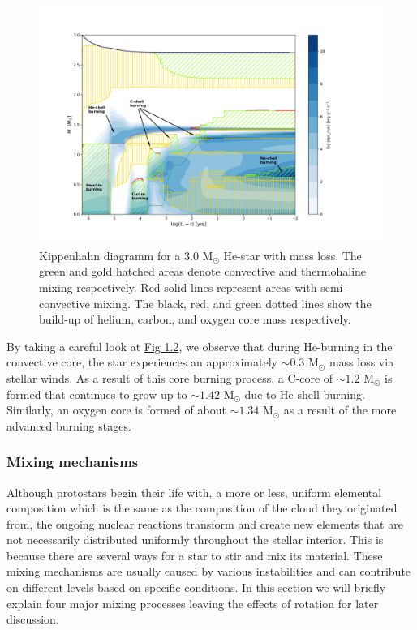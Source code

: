 \documentclass[../../main/thesis_msc.tex]{subfiles}
\begin{document}
				\begin{figure}[h]
					\centering
					\includegraphics[width=\textwidth]{../figures/chapter1/Kippenhahn_intro.png}
					\caption{Kippenhahn diagramm for a $3.0$ M$_{\odot}$ He-star with mass loss. The green and gold hatched areas denote convective and thermohaline mixing respectively. Red solid lines represent areas with semi-convective mixing. The black, red, and green dotted lines show the build-up of helium, carbon, and oxygen core mass respectively.}
					\label{fig:Kipp_3p0_ch1}
				\end{figure}
				
				By taking a careful look at \hyperref[fig:Kipp_3p0_ch1]{Fig 1.2}, we observe that during He-burning in the convective core, the star experiences an approximately $\sim 0.3$ M$_{\odot}$ mass loss via stellar winds. As a result of this core burning process, a C-core of $\sim 1.2$ M$_{\odot}$ is formed that continues to grow up to $\sim 1.42$ M$_{\odot}$ due to He-shell burning. Similarly, an oxygen core is formed of about $\sim 1.34$ M$_{\odot}$ as a result of the more advanced burning stages.
				
				
				
				
				
				
					\subsubsection{Mixing mechanisms}
					
						Although protostars begin their life with, a more or less, uniform elemental composition which is the same as the composition of the cloud they originated from, the ongoing nuclear reactions transform and create new elements that are not necessarily distributed uniformly throughout the stellar interior. This is because there are several ways for a star to stir and mix its material. These mixing mechanisms are usually caused by various instabilities and can contribute on different levels based on specific conditions. In this section we will briefly explain four major mixing processes leaving the effects of rotation for later discussion.
						
\end{document}
